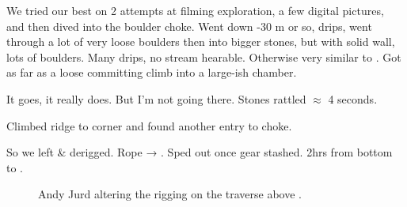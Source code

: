 We tried our best on 2 attempts at filming exploration, a few digital
pictures, and then dived into the boulder choke. Went down -30 m or so,
drips, went through a lot of very loose boulders then into bigger
stones, but with solid wall, lots of boulders. Many drips, no stream
hearable. Otherwise very similar to . Got as far as
a loose committing climb into a large-ish chamber.

It goes, it really does. But I'm not going there. Stones rattled
$\approx$ 4 seconds.

Climbed ridge to corner and found another entry to choke.

So we left \& derigged. Rope → . Sped out once gear stashed.
2hrs from bottom to .



\begin{figure}
\checkoddpage \ifoddpage \forcerectofloat \else \forceversofloat \fi
\centering
 \caption{Andy Jurd altering the rigging on the traverse above \protect{}. }
 \label{Plopzilla traverse}
\end{figure}
